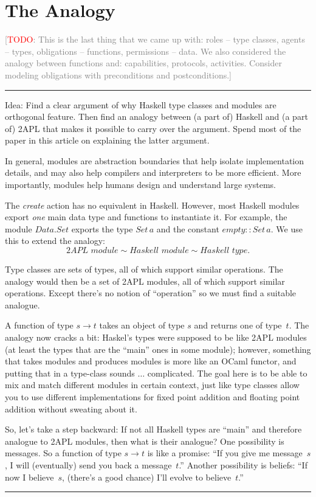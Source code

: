 \documentclass[conference,compsoc]{IEEEtran}
\newcommand{\todo}[1]{{\small \textcolor{gray}{[\textcolor{red}{TODO}: #1]}}}
\newenvironment{notes}{\medskip\hrule\nobreak\smallskip\narrower}{\smallskip\hrule\medskip}
\begin{document}
\section{The Analogy}

\todo{This is the last thing that we came up with: roles -- type classes, agents -- types, obligations -- functions, permissions -- data. We also considered the analogy between functions and: capabilities, protocols, activities. Consider modeling obligations with preconditions and postconditions.}

\begin{notes}
Idea: Find a clear argument of why Haskell type classes and modules are
orthogonal feature. Then find an analogy between (a part of) Haskell and (a
part of) 2APL that makes it possible to carry over the argument. Spend most
of the paper in this article on explaining the latter argument.

In general, modules are abstraction boundaries that help isolate
implementation details, and may also help compilers and interpreters to be
more efficient.  More importantly, modules help humans design and
understand large systems.

The \textit{create} action has no equivalent in Haskell. However, most
Haskell modules export \emph{one} main data type and functions to
instantiate it. For example, the module $\mathit{Data}.\mathit{Set}$
exports the type $\mathit{Set}\,a$ and the constant
$\mathit{empty}::\mathit{Set}\,a$.  We use this to extend the analogy: \[
\textit{2APL module} \sim \textit{Haskell module} \sim \textit{Haskell
type}. \]

Type classes are sets of types, all of which support similar operations.
The analogy would then be a set of 2APL modules, all of which support
similar operations. Except there's no notion of ``operation'' so we must
find a suitable analogue.

A function of type $s\to t$ takes an object of type $s$ and returns one of
type~$t$. The analogy now cracks a bit: Haskel's types were supposed to be
like 2APL modules (at least the types that are the ``main'' ones in some
module); however, something that takes modules and produces modules is more
like an OCaml functor, and putting that in a type-class sounds $\ldots$
complicated. The goal here is to be able to mix and match different modules
in certain context, just like type classes allow you to use different
implementations for fixed point addition and floating point addition
without sweating about it.

So, let's take a step backward: If not all Haskell types are ``main'' and
therefore analogue to 2APL modules, then what is their analogue? One
possibility is messages. So a function of type $s\to t$ is like a promise:
``If you give me message~$s$, I will (eventually) send you back a
message~$t$.'' Another possibility is beliefs: ``If now I believe~$s$,
(there's a good chance) I'll evolve to believe~$t$.''

\end{notes}
\end{document}
